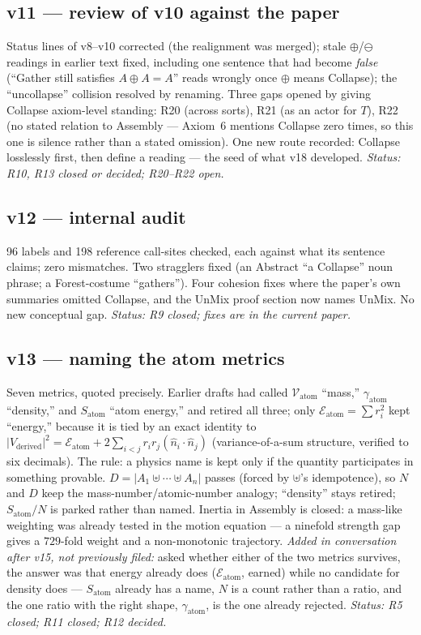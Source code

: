 \documentclass[11pt]{article}
\begin{document}
\subsection*{v11 --- review of v10 against the paper}
Status lines of v8--v10 corrected (the realignment was merged); stale
$\oplus$/$\ominus$ readings in earlier text fixed, including one
sentence that had become \emph{false} (``Gather still satisfies
$A\oplus A=A$'' reads wrongly once $\oplus$ means Collapse); the
``uncollapse'' collision resolved by renaming. Three gaps opened by
giving Collapse axiom-level standing: R20 (across sorts), R21 (as an
actor for $T$), R22 (no stated relation to Assembly --- Axiom~6
mentions Collapse zero times, so this one is silence rather than a
stated omission). One new route recorded: Collapse losslessly first,
then define a reading --- the seed of what v18 developed.
\emph{Status: R10, R13 closed or decided; R20--R22 open.}

\subsection*{v12 --- internal audit}
96 labels and 198 reference call-sites checked, each against what
its sentence claims; zero mismatches. Two stragglers fixed (an
Abstract ``a Collapse'' noun phrase; a Forest-costume ``gathers'').
Four cohesion fixes where the paper's own summaries omitted Collapse,
and the UnMix proof section now names UnMix. No new conceptual gap.
\emph{Status: R9 closed; fixes are in the current paper.}

\subsection*{v13 --- naming the atom metrics}
Seven metrics, quoted precisely. Earlier drafts had called
$\mathcal{V}_{\text{atom}}$ ``mass,'' $\gamma_{\text{atom}}$
``density,'' and $S_{\text{atom}}$ ``atom energy,'' and retired all
three; only $\mathcal{E}_{\text{atom}}=\sum r_i^2$ kept ``energy,''
because it is tied by an exact identity to
$|V_{\text{derived}}|^2=\mathcal{E}_{\text{atom}}+2\sum_{i<j}r_ir_j(\hat n_i\!\cdot\!\hat n_j)$
(variance-of-a-sum structure, verified to six decimals). The rule:
a physics name is kept only if the quantity participates in something
provable. $D=|A_1\uplus\cdots\uplus A_n|$ passes (forced by $\uplus$'s
idempotence), so $N$ and $D$ keep the mass-number/atomic-number
analogy; ``density'' stays retired; $S_{\text{atom}}/N$ is parked
rather than named. Inertia in Assembly is closed: a mass-like
weighting was already tested in the motion equation --- a ninefold
strength gap gives a $729$-fold weight and a non-monotonic
trajectory.
\emph{Added in conversation after v15, not previously filed:} asked
whether either of the two metrics survives, the answer was that
energy already does ($\mathcal{E}_{\text{atom}}$, earned) while no
candidate for density does --- $S_{\text{atom}}$ already has a name,
$N$ is a count rather than a ratio, and the one ratio with the right
shape, $\gamma_{\text{atom}}$, is the one already rejected.
\emph{Status: R5 closed; R11 closed; R12 decided.}
\end{document}
